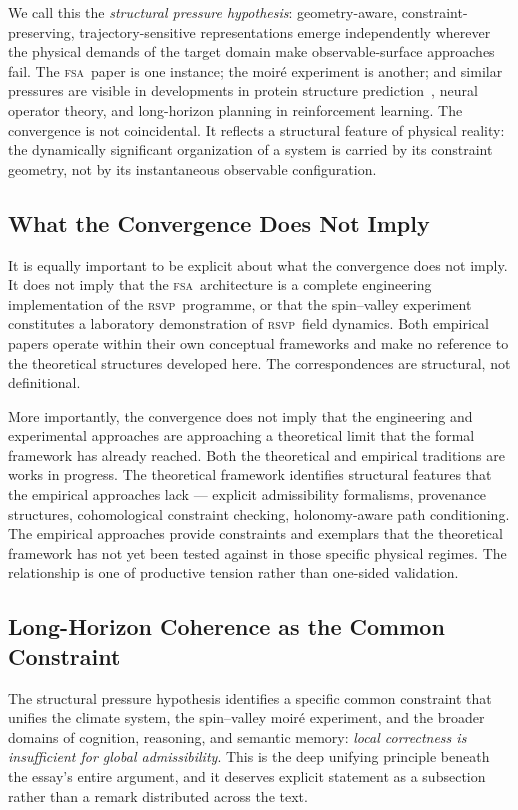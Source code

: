 \documentclass[11pt,a4paper]{article}
\theoremstyle{plain}
\theoremstyle{definition}
\theoremstyle{remark}
\newcommand{\RSVP}{\textup{\textsc{rsvp}}}
\newcommand{\FSA}{\textup{\textsc{fsa}}}
\begin{document}
We call this the \textit{structural pressure hypothesis}: geometry-aware,
constraint-preserving, trajectory-sensitive representations emerge
independently wherever the physical demands of the target domain make
observable-surface approaches fail. The \FSA\ paper is one instance; the
moiré experiment is another; and similar pressures are visible in
developments in protein structure prediction~\cite{Lam2023,Bi2023}, neural
operator theory, and long-horizon planning in reinforcement learning. The
convergence is not coincidental. It reflects a structural feature of
physical reality: the dynamically significant organization of a system is
carried by its constraint geometry, not by its instantaneous observable
configuration.

\subsection{What the Convergence Does Not Imply}

It is equally important to be explicit about what the convergence does not
imply. It does not imply that the \FSA\ architecture is a complete
engineering implementation of the \RSVP\ programme, or that the spin--valley
experiment constitutes a laboratory demonstration of \RSVP\ field dynamics.
Both empirical papers operate within their own conceptual frameworks and
make no reference to the theoretical structures developed here. The
correspondences are structural, not definitional.

More importantly, the convergence does not imply that the engineering and
experimental approaches are approaching a theoretical limit that the formal
framework has already reached. Both the theoretical and empirical traditions
are works in progress. The theoretical framework identifies structural
features that the empirical approaches lack --- explicit admissibility
formalisms, provenance structures, cohomological constraint checking,
holonomy-aware path conditioning. The empirical approaches provide
constraints and exemplars that the theoretical framework has not yet been
tested against in those specific physical regimes. The relationship is one
of productive tension rather than one-sided validation.

\subsection{Long-Horizon Coherence as the Common Constraint}

The structural pressure hypothesis identifies a specific common constraint
that unifies the climate system, the spin--valley moiré experiment, and the
broader domains of cognition, reasoning, and semantic memory: \textit{local
correctness is insufficient for global admissibility}. This is the deep
unifying principle beneath the essay's entire argument, and it deserves
explicit statement as a subsection rather than a remark distributed across
the text.
\end{document}
